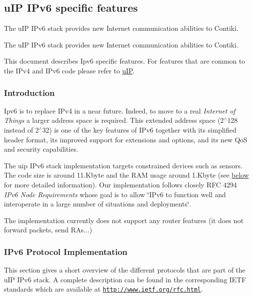 \hypertarget{a00075}{}\subsection{u\+IP I\+Pv6 specific features}
\label{a00075}


The u\+IP I\+Pv6 stack provides new Internet communication abilities to Contiki.  


The u\+IP I\+Pv6 stack provides new Internet communication abilities to Contiki. 

This document describes Ipv6 specific features. For features that are common to the I\+Pv4 and I\+Pv6 code please refer to \hyperlink{a00074}{u\+IP}.



\hypertarget{a00075_intro}{}\subsubsection{Introduction}\label{a00075_intro}
Ipv6 is to replace I\+Pv4 in a near future. Indeed, to move to a real {\itshape  Internet of Things } a larger address space is required. This extended address space (2$^\wedge$128 instead of 2$^\wedge$32) is one of the key features of I\+Pv6 together with its simplified header format, its improved support for extensions and options, and its new QoS and security capabilities.

The uip I\+Pv6 stack implementation targets constrained devices such as sensors. The code size is around 11.\+Kbyte and the R\+AM usage around 1.\+Kbyte (see \hyperlink{a00075_size}{below} for more detailed information). Our implementation follows closely R\+FC 4294 {\itshape I\+Pv6 Node Requirements} whose goal is to allow \char`\"{}\+I\+Pv6 to function well and
interoperate in a large number of situations and deployments\char`\"{}.

The implementation currently does not support any router features (it does not forward packets, send R\+As...)



\hypertarget{a00075_protocol}{}\subsubsection{I\+Pv6 Protocol Implementation}\label{a00075_protocol}
This section gives a short overview of the different protocols that are part of the u\+IP I\+Pv6 stack. A complete description can be found in the corresponding I\+E\+TF standards which are available at \href{http://www.ietf.org/rfc.html}{\tt http\+://www.\+ietf.\+org/rfc.\+html}.

